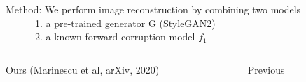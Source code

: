 \documentclass[8pt,xcolor=table,aspectratio=169]{beamer}
\begin{document}
% 
% 
% 
%  
%   
%  
%  
%  
% 
% 
%  


\begin{frame}{Method: We perform image reconstruction by combining two models\\
\ \ \ \ \ \  1. a pre-trained generator G (StyleGAN2)\\
\ \ \ \ \ \  2. a known forward corruption model $f_1$
}



\begin{columns}[t]
 \begin{column}{0.6\textwidth}
\centering
 
\begin{overprint}
 
  \brgmoursshortloss 
  \brgmours

\end{overprint} 
  Ours (Marinescu et al, arXiv, 2020)
 \end{column}

 \begin{column}{0.3\textwidth}
  \centering

  \brgmprev
  Previous

 
 \end{column}
\end{columns} 
 


 
\end{frame}
\end{document}
